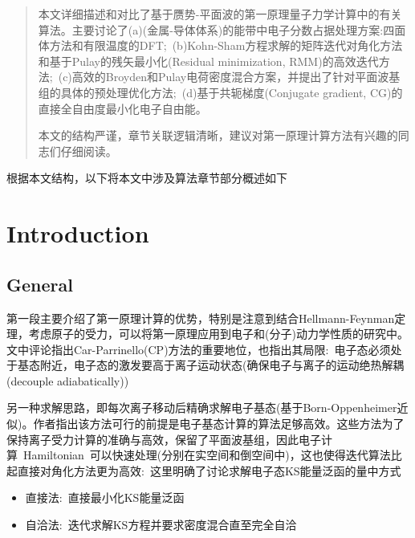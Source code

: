 \documentclass[14pt]{article}      %
\begin{document}
\begin{abstract}
	本文详细描述和对比了基于赝势-平面波的第一原理量子力学计算中的有关算法。主要讨论了(\textrm{a})(金属-导体体系)的能带中电子分数占据处理方案:四面体方法和有限温度的\textrm{DFT};~(\textrm{b})\textrm{Kohn-Sham}方程求解的矩阵迭代对角化方法和基于\textrm{Pulay}的残矢最小化(\textrm{Residual minimization, RMM})的高效迭代方法;~(\textrm{c})高效的\textrm{Broyden}和\textrm{Pulay}电荷密度混合方案，并提出了针对平面波基组的具体的预处理优化方法;~(\textrm{d})基于共轭梯度(\textrm{Conjugate gradient, CG})的直接全自由度最小化电子自由能。

	本文的结构严谨，章节关联逻辑清晰，建议对第一原理计算方法有兴趣的同志们仔细阅读。
\end{abstract}


根据本文结构，以下将本文中涉及算法章节部分概述如下
\section{Introduction}
\subsection{General}
第一段主要介绍了第一原理计算的优势，特别是注意到结合\textrm{Hellmann-Feynman}定理，考虑原子的受力，可以将第一原理应用到电子和(分子)动力学性质的研究中。文中评论指出\textrm{Car-Parrinello(CP)}方法的重要地位，也指出其局限:~电子态必须处于基态附近，电子态的激发要高于离子运动状态(确保电子与离子的运动绝热解耦(\textrm{decouple adiabatically}))

另一种求解思路，即每次离子移动后精确求解电子基态(基于\textrm{Born-Oppenheimer}近似)。作者指出该方法可行的前提是电子基态计算的算法足够高效。这些方法为了保持离子受力计算的准确与高效，保留了平面波基组，因此电子计算~\textrm{Hamiltonian}~可以快速处理(分别在实空间和倒空间中)，这也使得迭代算法比起直接对角化方法更为高效:~这里明确了讨论求解电子态\textrm{KS}能量泛函的量中方式
\begin{itemize}
	\item 直接法:~直接最小化\textrm{KS}能量泛函
	\item 自洽法:~迭代求解\textrm{KS}方程并要求密度混合直至完全自洽
\end{itemize}
\end{document}
